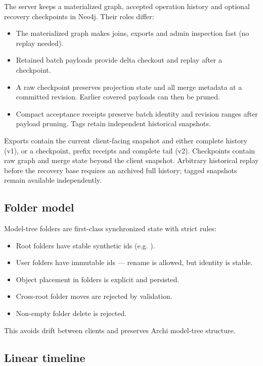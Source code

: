 The server keeps a materialized graph, accepted operation history and optional
recovery checkpoints in Neo4j. Their roles differ:

\begin{itemize}
\item The materialized graph makes joins, exports and admin inspection fast
  (no replay needed).
\item Retained batch payloads provide delta checkout and replay after a checkpoint.
\item A raw checkpoint preserves projection state and all merge metadata at
  a committed revision. Earlier covered payloads can then be pruned.
\item Compact acceptance receipts preserve batch identity and revision ranges
  after payload pruning. Tags retain independent historical snapshots.
\end{itemize}

Exports contain the current client-facing snapshot and either complete
history (v1), or a checkpoint, prefix receipts and complete tail (v2).
Checkpoints contain raw graph and merge state beyond the client snapshot.
Arbitrary historical replay before the recovery base requires an archived
full history; tagged snapshots remain available independently.

\subsection{Folder model}

Model-tree folders are first-class synchronized state with strict rules:

\begin{itemize}
\item Root folders have stable synthetic ids (e.g. ).
\item User folders have immutable ids --- rename is allowed, but identity is
  stable.
\item Object placement in folders is explicit and persisted.
\item Cross-root folder moves are rejected by validation.
\item Non-empty folder delete is rejected.
\end{itemize}

This avoids drift between clients and preserves Archi model-tree structure.

\subsection{Linear timeline}

